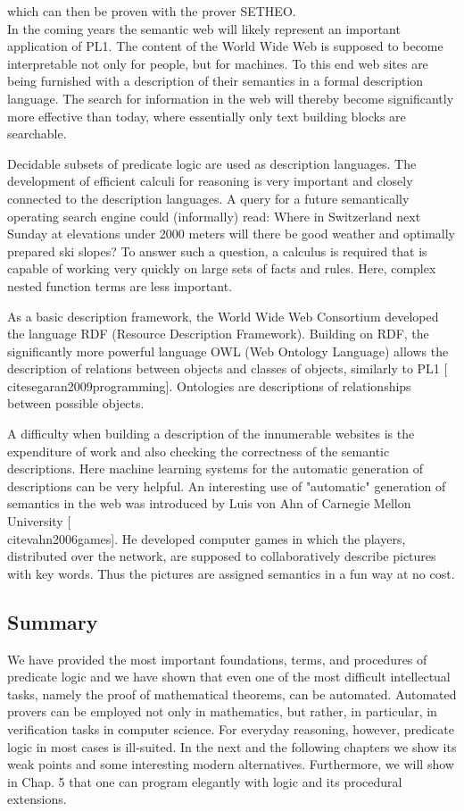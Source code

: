 \documentclass[10pt]{book}
\begin{document}
which can then be proven with the prover SETHEO.\\
In the coming years the semantic web will likely represent an important application of PL1. The content of the World Wide Web is supposed to become interpretable not only for people, but for machines. To this end web sites are being furnished with a description of their semantics in a formal description language. The search for information in the web will thereby become significantly more effective than today, where essentially only text building blocks are searchable.

Decidable subsets of predicate logic are used as description languages. The development of efficient calculi for reasoning is very important and closely connected to the description languages. A query for a future semantically operating search engine could (informally) read: Where in Switzerland next Sunday at elevations under 2000 meters will there be good weather and optimally prepared ski slopes? To answer such a question, a calculus is required that is capable of working very quickly on large sets of facts and rules. Here, complex nested function terms are less important.

As a basic description framework, the World Wide Web Consortium developed the language RDF (Resource Description Framework). Building on RDF, the significantly more powerful language OWL (Web Ontology Language) allows the description of relations between objects and classes of objects, similarly to PL1 [\\cite{segaran2009programming}]. Ontologies are descriptions of relationships between possible objects.


A difficulty when building a description of the innumerable websites is the expenditure of work and also checking the correctness of the semantic descriptions. Here machine learning systems for the automatic generation of descriptions can be very helpful. An interesting use of "automatic" generation of semantics in the web was introduced by Luis von Ahn of Carnegie Mellon University [\\cite{vahn2006games}]. He developed computer games in which the players, distributed over the network, are supposed to collaboratively describe pictures with key words. Thus the pictures are assigned semantics in a fun way at no cost.

\subsection*{Summary}
We have provided the most important foundations, terms, and procedures of predicate logic and we have shown that even one of the most difficult intellectual tasks, namely the proof of mathematical theorems, can be automated. Automated provers can be employed not only in mathematics, but rather, in particular, in verification tasks in computer science. For everyday reasoning, however, predicate logic in most cases is ill-suited. In the next and the following chapters we show its weak points and some interesting modern alternatives. Furthermore, we will show in Chap. 5 that one can program elegantly with logic and its procedural extensions.
\end{document}
